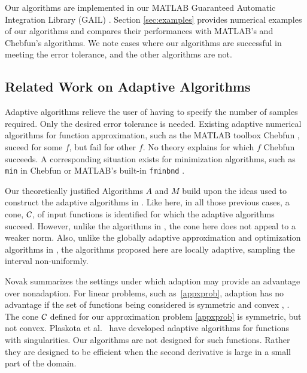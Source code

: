 \documentclass[review]{elsarticle}
\theoremstyle{definition}
\begin{document}
Our algorithms are implemented in our MATLAB Guaranteed Automatic
Integration Library (GAIL) \cite{ChoEtal15a}. Section \ref{sec:examples}
provides numerical examples of our algorithms and compares their
performances with MATLAB's and Chebfun's algorithms. We note cases where our
algorithms are successful in meeting the error tolerance, and the other
algorithms are not.

\subsection{Related Work on Adaptive Algorithms}

Adaptive algorithms relieve the user of having to specify the number of samples
required. Only the desired error tolerance is needed. Existing adaptive
numerical algorithms for function approximation, such as the MATLAB toolbox
Chebfun \citep{TrefEtal16a}, suceed for some $f$, but fail for other $f$. No
theory explains for which $f$ Chebfun succeeds. A corresponding situation exists
for minimization algorithms, such as \texttt{min} in Chebfun or MATLAB's
built-in \texttt{fminbnd} \citep{MAT9.0}.

Our theoretically justified Algorithms $A$ and $M$ build upon the ideas used to
construct the adaptive algorithms in \cite{HicEtal14b, Din15a, HicEtal14a,
HicJim16a, Jia16a, JimHic16a,Ton14a}. Like here, in all those previous cases, a
cone, $\mathcal{C}$, of input functions is identified for which the adaptive algorithms
succeed. However, unlike the algorithms in \cite{HicEtal14b, Din15a,
HicEtal14a,Ton14a}, the cone here does not appeal to a weaker norm. Also, unlike
the globally adaptive approximation and optimization algorithms in
\cite{HicEtal14b,Ton14a}, the algorithms proposed here are locally adaptive,
sampling the interval non-uniformly.

Novak \cite{Nov96a} summarizes the settings under which adaption may provide an
advantage over nonadaption. For linear problems, such as~\eqref{appxprob},
adaption has no advantage if the set of functions being considered is symmetric
and convex \cite[Theorem 1]{Nov96a}, \cite[Chapter 4, Theorem
5.2.1]{TraWasWoz88}. The cone $\mathcal{C}$ defined for our approximation problem
\eqref{appxprob} is symmetric, but not convex. Plaskota et al.~\cite{PlaEtal08a}
have developed adaptive algorithms for functions with singularities. Our
algorithms are not designed for such functions. Rather they are
designed to be efficient when the second derivative is large in a small part of
the domain.
\end{document}
